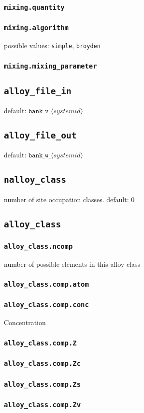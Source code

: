 \subsubsection{\texttt{mixing.quantity}}

\subsubsection{\texttt{mixing.algorithm}}
possible values: \texttt{simple}, \texttt{broyden}

\subsubsection{\texttt{mixing.mixing\_parameter}}


\subsection{\texttt{alloy\_file\_in}}
default: $\texttt{bank\_v\_}\langle\textit{systemid}\rangle$

\subsection{\texttt{alloy\_file\_out}}
default: $\texttt{bank\_w\_}\langle\textit{systemid}\rangle$

\subsection{\texttt{nalloy\_class}}
number of site occupation classes.
default: 0

\subsection{\texttt{alloy\_class}}
\subsubsection{\texttt{alloy\_class.ncomp}}
number of possible elements in this alloy class
\subsubsection{\texttt{alloy\_class.comp.atom}}
\subsubsection{\texttt{alloy\_class.comp.conc}}
Concentration
\subsubsection{\texttt{alloy\_class.comp.Z}}
\subsubsection{\texttt{alloy\_class.comp.Zc}}
\subsubsection{\texttt{alloy\_class.comp.Zs}}
\subsubsection{\texttt{alloy\_class.comp.Zv}}


